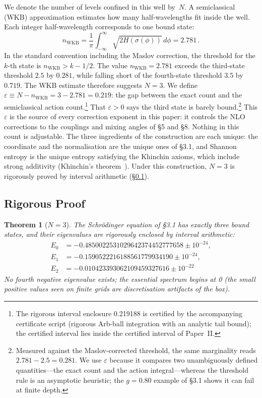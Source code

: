 \documentclass[12pt,a4paper]{article}
\newtheorem{theorem}{Theorem}
\begin{document}
We denote the number of levels confined in this well by~$N$.
A semiclassical (WKB) approximation estimates how many
half-wavelengths fit inside the well.
Each integer half-wavelength corresponds to one bound state:
\begin{equation}
  n_\mathrm{WKB}
  = \frac{1}{\pi}\int_{-\infty}^{\infty}
    \sqrt{2H(\sigma(\phi))}\,d\phi
  = 2.781\,.
\end{equation}
In the standard convention including the Maslov correction, the threshold for the $k$-th state is $n_\mathrm{WKB} > k - 1/2$. The value $n_\mathrm{WKB} = 2.781$ exceeds the third-state threshold $2.5$ by $0.281$, while falling short of the fourth-state threshold $3.5$ by $0.719$. The WKB estimate therefore suggests $N = 3$.
We define $\varepsilon \equiv N - n_\mathrm{WKB} = 3 - 2.781 = 0.219$: the gap between the exact count and the semiclassical action count.\footnote{The rigorous interval enclosure 0.219188 is certified by the accompanying certificate script (rigorous Arb-ball integration with an analytic tail bound); the certified interval lies inside the certified interval of Paper~II.} That $\varepsilon > 0$ says the third state is barely bound.\footnote{Measured against the Maslov-corrected threshold, the same marginality reads $2.781 - 2.5 = 0.281$. We use $\varepsilon$ because it compares two unambiguously defined quantities---the exact count and the action integral---whereas the threshold rule is an asymptotic heuristic; the $g = 0.80$ example of \S3.1 shows it can fail at finite depth.} This $\varepsilon$ is the source of every correction exponent in this paper: it controls the NLO corrections to the couplings and mixing angles of \S5 and \S8.
Nothing in this count is adjustable. The three ingredients of the construction are each unique: the coordinate and the normalisation are the unique ones of \S3.1, and Shannon entropy is the unique entropy satisfying the Khinchin axioms, which include strong additivity (Khinchin's theorem~\cite{aczel,khinchin}). Under this construction, $N = 3$ is rigorously proved by interval arithmetic (\S\ref{sec:rigorous}).

\subsection{Rigorous Proof}\label{sec:rigorous}

\begin{theorem}[$N = 3$]\label{thm:N3}
The Schr\"odinger equation of \S3.1 has exactly three bound states, and their eigenvalues are rigorously enclosed by interval arithmetic:
\[
\begin{aligned}
  E_0 &= -0.4850022531029642374452777658 \pm 10^{-24},\\
  E_1 &= -0.1590522216188561779934190 \pm 10^{-24},\\
  E_2 &= -0.010423393062109459327616 \pm 10^{-22}
\end{aligned}
\]
No fourth negative eigenvalue exists; the essential spectrum begins at 0 (the small positive values seen on finite grids are discretisation artifacts of the box).
\end{theorem}
\end{document}
